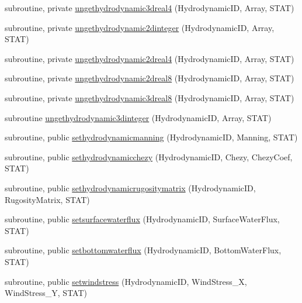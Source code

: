 \begin{DoxyCompactItemize}
\item 
subroutine, private \mbox{\hyperlink{namespacemodulehydrodynamic_a624a2d0694d918e1923e5b6464802fce}{ungethydrodynamic3dreal4}} (Hydrodynamic\+ID, Array, S\+T\+AT)
\item 
subroutine, private \mbox{\hyperlink{namespacemodulehydrodynamic_a850463758a40d651e2c1a5de7adb45cc}{ungethydrodynamic2dinteger}} (Hydrodynamic\+ID, Array, S\+T\+AT)
\item 
subroutine, private \mbox{\hyperlink{namespacemodulehydrodynamic_a7c4ba25ca6d8985ff9fc7b27aebbf48e}{ungethydrodynamic2dreal4}} (Hydrodynamic\+ID, Array, S\+T\+AT)
\item 
subroutine, private \mbox{\hyperlink{namespacemodulehydrodynamic_a38b09b823496f823b15a0b020595a9c1}{ungethydrodynamic2dreal8}} (Hydrodynamic\+ID, Array, S\+T\+AT)
\item 
subroutine, private \mbox{\hyperlink{namespacemodulehydrodynamic_afc2a72c29bd11cd7048168f6275a3938}{ungethydrodynamic3dreal8}} (Hydrodynamic\+ID, Array, S\+T\+AT)
\item 
subroutine \mbox{\hyperlink{namespacemodulehydrodynamic_aeb1abec5f84ff629b6a72c2c9955c7af}{ungethydrodynamic3dinteger}} (Hydrodynamic\+ID, Array, S\+T\+AT)
\item 
subroutine, public \mbox{\hyperlink{namespacemodulehydrodynamic_afcbe369a4cc8b78bc18a290f3e05a412}{sethydrodynamicmanning}} (Hydrodynamic\+ID, Manning, S\+T\+AT)
\item 
subroutine, public \mbox{\hyperlink{namespacemodulehydrodynamic_aa753ccba1fb48238465631f89ecd8cb6}{sethydrodynamicchezy}} (Hydrodynamic\+ID, Chezy, Chezy\+Coef, S\+T\+AT)
\item 
subroutine, public \mbox{\hyperlink{namespacemodulehydrodynamic_abf6161f88fc2f65b07d9f8764a501633}{sethydrodynamicrugositymatrix}} (Hydrodynamic\+ID, Rugosity\+Matrix, S\+T\+AT)
\item 
subroutine, public \mbox{\hyperlink{namespacemodulehydrodynamic_a9f134631e27c5fcbe9d6185409149bb5}{setsurfacewaterflux}} (Hydrodynamic\+ID, Surface\+Water\+Flux, S\+T\+AT)
\item 
subroutine, public \mbox{\hyperlink{namespacemodulehydrodynamic_ab2050ec05277d36366cce71907994973}{setbottomwaterflux}} (Hydrodynamic\+ID, Bottom\+Water\+Flux, S\+T\+AT)
\item 
subroutine, public \mbox{\hyperlink{namespacemodulehydrodynamic_a9286159a46a146fe7713e10cda0bf636}{setwindstress}} (Hydrodynamic\+ID, Wind\+Stress\+\_\+X, Wind\+Stress\+\_\+Y, S\+T\+AT)
\item 

\end{DoxyCompactItemize}
